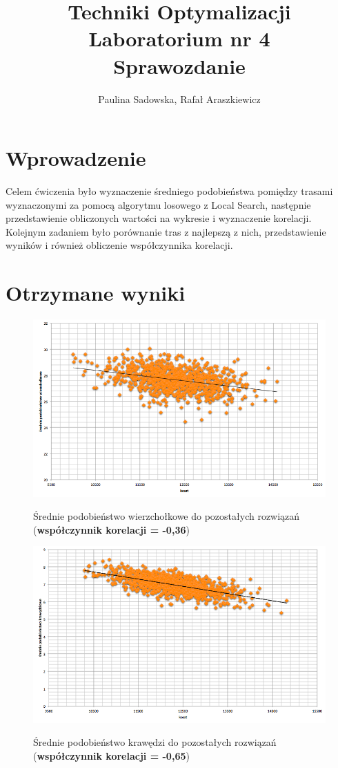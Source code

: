 \documentclass[a4paper 10pt]{article}
\title{\textbf{Techniki Optymalizacji} \\
Laboratorium nr 4 \\
Sprawozdanie}
\author{Paulina Sadowska, Rafał Araszkiewicz}
\begin{document}
\maketitle

\section{Wprowadzenie}
Celem ćwiczenia było wyznaczenie średniego podobieństwa pomiędzy trasami wyznaczonymi za pomocą algorytmu losowego z Local Search, następnie przedstawienie obliczonych wartości na wykresie i wyznaczenie korelacji. Kolejnym zadaniem było porównanie tras z najlepszą z nich, przedstawienie wyników i również obliczenie współczynnika korelacji.

\section{Otrzymane wyniki}

\begin{figure} [H]
\centering
\caption{Średnie podobieństwo wierzchołkowe do pozostałych rozwiązań (\textbf{współczynnik korelacji = -0,36})}
\includegraphics[angle=0,width = 1\textwidth, height=!]{images/edge.png}
\label{Rys. Edges}
\end{figure}

\begin{figure} [H]
\centering
\caption{Średnie podobieństwo krawędzi do pozostałych rozwiązań (\textbf{współczynnik korelacji = -0,65})}
\includegraphics[angle=0,width = 1\textwidth, height=!]{images/node.png}
\label{Rys. Node}
\end{figure}
\end{document}
